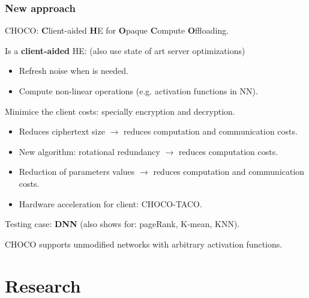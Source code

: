 \documentclass[10pt,handout]{beamer}
\begin{document}
\begin{frame}
\frametitle{New approach}
    \vspace{-0.2cm}
CHOCO: \textbf{C}lient-aided \textbf{H}E for \textbf{O}paque \textbf{C}ompute \textbf{O}ffloading.

    \vspace{-0.2cm}
    Is a \textbf{client-aided} HE: (also use state of art server optimizations)
\pause
    \vspace{-0.4cm}
\begin{itemize}\itemsep-0.7em
    \item Refresh noise when is needed.
    \item Compute non-linear operations (e.g. activation functions in NN).
\end{itemize}

\pause
    Minimice the client costs: specially encryption and decryption.
    \vspace{-0.2cm}
\begin{itemize}\itemsep-0.7em
        \item Reduces ciphertext size $\rightarrow$ reduces computation and communication costs.
    \item New algorithm: rotational redundancy $\rightarrow$ reduces computation costs.
\pause
    \item Reduction of parameters values $\rightarrow$ reduces computation and communication costs.
    \item Hardware acceleration for client: CHOCO-TACO.
\end{itemize}
\pause
    Testing case: \textbf{DNN} (also shows for: pageRank, K-mean, KNN).

    CHOCO supports unmodified networks with arbitrary activation functions.

\end{frame}



\section{Research}
\end{document}
